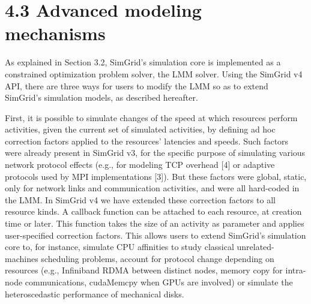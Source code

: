 \documentclass[
]{article}
\begin{document}
\section{4.3 Advanced modeling
mechanisms}\label{advanced-modeling-mechanisms}

As explained in Section 3.2, SimGrid's simulation core is implemented as
a constrained optimization problem solver, the LMM solver. Using the
SimGrid v4 API, there are three ways for users to modify the LMM so as
to extend SimGrid's simulation models, as described hereafter.

First, it is possible to simulate changes of the speed at which
resources perform activities, given the current set of simulated
activities, by defining ad hoc correction factors applied to the
resources' latencies and speeds. Such factors were already present in
SimGrid v3, for the specific purpose of simulating various network
protocol effects (e.g., for modeling TCP overhead {[}4{]} or adaptive
protocols used by MPI implementations {[}3{]}). But these factors were
global, static, only for network links and communication activities, and
were all hard-coded in the LMM. In SimGrid v4 we have extended these
correction factors to all resource kinds. A callback function can be
attached to each resource, at creation time or later. This function
takes the size of an activity as parameter and applies user-specified
correction factors. This allows users to extend SimGrid's simulation
core to, for instance, simulate CPU affinities to study classical
unrelated-machines scheduling problems, account for protocol change
depending on resources (e.g., Infiniband RDMA between distinct nodes,
memory copy for intra-node communications, cudaMemcpy when GPUs are
involved) or simulate the heteroscedastic performance of mechanical
disks.
\end{document}
